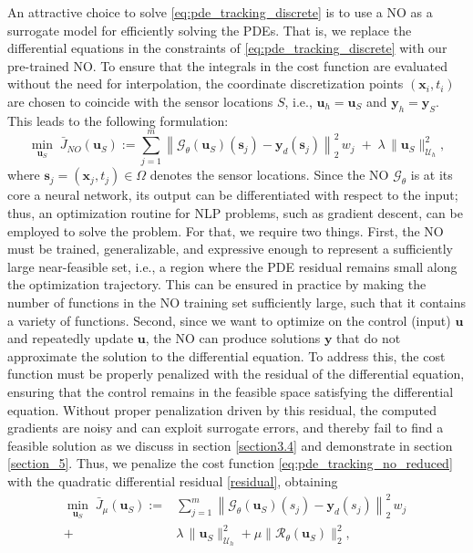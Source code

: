 \documentclass[final,1p,times]{elsarticle}
\theoremstyle{plain} %
\theoremstyle{definition} %
\theoremstyle{remark} %
\begin{document}
An attractive choice to solve \eqref{eq:pde_tracking_discrete} is to use a NO as a surrogate model for efficiently solving the PDEs. That is, we replace the differential equations in the constraints of \eqref{eq:pde_tracking_discrete} with our pre-trained NO. To ensure that the integrals in the cost function are evaluated without the need for interpolation, the coordinate discretization points $(\mathbf{x}_i,t_i)$ are chosen to coincide with the sensor locations $S$, i.e., $\mathbf{u}_h=\mathbf{u}_S$ and $\mathbf{y}_h=\mathbf{y}_S$. This leads to the following formulation:
%
\begin{equation}\label{eq:pde_tracking_no_reduced}
\min_{\mathbf{u}_S}\;
\bar{J}_{NO}(\mathbf{u}_S)
:=
\sum_{j=1}^{m}
\left\|\mathcal{G}_\theta(\mathbf{u}_S)(\mathbf{s}_j)-\mathbf{y}_{d}(\mathbf{s}_j)\right\|_2^2\,w_j
\;+\;
\lambda\,\|\mathbf{u}_S\|_{\mathcal{U}_h}^2,
\end{equation}
where $\mathbf{s}_j=(\mathbf{x}_j,t_j)\in\Omega$ denotes the sensor locations.
%
Since the NO $\mathcal{G_\theta}$ is at its core a neural network, its output can be differentiated with respect to the input; thus, an optimization routine for NLP problems, such as gradient descent, can be employed to solve the problem. For that, we require two things. First, the NO must be trained, generalizable, and expressive enough to represent a sufficiently large near-feasible set, i.e., a region where the PDE residual remains small along the optimization trajectory. This can be ensured in practice by making the number of functions in the NO training set sufficiently large, such that it contains a variety of functions. Second, since we want to optimize on the control (input) $\mathbf{u}$ and repeatedly update $\mathbf{u}$, the NO can produce solutions $\mathbf{y}$ that do not approximate the solution to the differential equation. To address this, the cost function must be properly penalized with the residual of the differential equation, ensuring that the control remains in the feasible space satisfying the differential equation. Without proper penalization driven by this residual, the computed gradients are noisy and can exploit surrogate errors, and thereby fail to find a feasible solution as we discuss in section \ref{section3.4} and demonstrate in section \ref{section_5}. Thus, we penalize the cost function \eqref{eq:pde_tracking_no_reduced} with the quadratic differential residual \eqref{residual}, obtaining%
%
\begin{equation}\label{eq:pde_tracking_no_penalized_reduced}
\begin{aligned}
\min_{\mathbf{u}_S}\;
\bar{J}_{\mu}(\mathbf{u}_S)
:=&
\sum_{j=1}^{m}
\left\|\mathcal{G}_\theta(\mathbf{u}_S)(s_j)-\mathbf{y}_{d}(s_j)\right\|_2^2\,w_j
\;\\
+&\lambda\,\|\mathbf{u}_S\|_{\mathcal{U}_h}^2 +
\mu\|\mathcal{R}_\theta(\mathbf{u}_S)\|^2_2, 
\end{aligned}
\end{equation}
\end{document}

